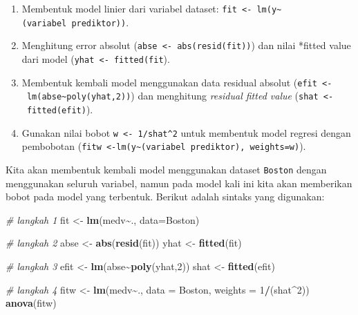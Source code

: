 \documentclass[
]{book}
\newenvironment{Shaded}{\begin{snugshade}}{\end{snugshade}}
\newcommand{\AttributeTok}[1]{\textcolor[rgb]{0.13,0.29,0.53}{#1}}
\newcommand{\CommentTok}[1]{\textcolor[rgb]{0.56,0.35,0.01}{\textit{#1}}}
\newcommand{\DecValTok}[1]{\textcolor[rgb]{0.00,0.00,0.81}{#1}}
\newcommand{\FunctionTok}[1]{\textcolor[rgb]{0.13,0.29,0.53}{\textbf{#1}}}
\newcommand{\NormalTok}[1]{#1}
\newcommand{\OtherTok}[1]{\textcolor[rgb]{0.56,0.35,0.01}{#1}}
\newcommand{\SpecialCharTok}[1]{\textcolor[rgb]{0.81,0.36,0.00}{\textbf{#1}}}
\providecommand{\tightlist}{%
  \setlength{\itemsep}{0pt}\setlength{\parskip}{0pt}}
\theoremstyle{definition}
\theoremstyle{definition}
\theoremstyle{definition}
\theoremstyle{definition}
\theoremstyle{remark}
\begin{document}
\begin{enumerate}
\def\labelenumi{\arabic{enumi}.}
\tightlist
\item
  Membentuk model linier dari variabel dataset: \texttt{fit\ \textless{}-\ lm(y\textasciitilde{}(variabel\ prediktor))}.
\item
  Menghitung error absolut (\texttt{abse\ \textless{}-\ abs(resid(fit))}) dan nilai *fitted value dari model (\texttt{yhat\ \textless{}-\ fitted(fit}).
\item
  Membentuk kembali model menggunakan data residual absolut (\texttt{efit\ \textless{}-\ lm(abse\textasciitilde{}poly(yhat,2))}) dan menghitung \emph{residual fitted value} (\texttt{shat\ \textless{}-\ fitted(efit)}).
\item
  Gunakan nilai bobot \texttt{w\ \textless{}-\ 1/shat\^{}2} untuk membentuk model regresi dengan pembobotan (\texttt{fitw\ \textless{}-lm(y\textasciitilde{}(variabel\ prediktor),\ weights=w)}).
\end{enumerate}

Kita akan membentuk kembali model menggunakan dataset \texttt{Boston} dengan menggunakan seluruh variabel, namun pada model kali ini kita akan memberikan bobot pada model yang terbentuk. Berikut adalah sintaks yang digunakan:

\begin{Shaded}
\begin{Highlighting}[]
\CommentTok{\# langkah 1}
\NormalTok{fit }\OtherTok{\textless{}{-}} \FunctionTok{lm}\NormalTok{(medv}\SpecialCharTok{\textasciitilde{}}\NormalTok{., }\AttributeTok{data=}\NormalTok{Boston)}

\CommentTok{\# langkah 2}
\NormalTok{abse }\OtherTok{\textless{}{-}} \FunctionTok{abs}\NormalTok{(}\FunctionTok{resid}\NormalTok{(fit))}
\NormalTok{yhat }\OtherTok{\textless{}{-}} \FunctionTok{fitted}\NormalTok{(fit)}

\CommentTok{\# langkah 3}
\NormalTok{efit }\OtherTok{\textless{}{-}} \FunctionTok{lm}\NormalTok{(abse}\SpecialCharTok{\textasciitilde{}}\FunctionTok{poly}\NormalTok{(yhat,}\DecValTok{2}\NormalTok{))}
\NormalTok{shat }\OtherTok{\textless{}{-}} \FunctionTok{fitted}\NormalTok{(efit)}

\CommentTok{\# langkah 4}
\NormalTok{fitw }\OtherTok{\textless{}{-}} \FunctionTok{lm}\NormalTok{(medv}\SpecialCharTok{\textasciitilde{}}\NormalTok{., }\AttributeTok{data =}\NormalTok{ Boston, }\AttributeTok{weights =} \DecValTok{1}\SpecialCharTok{/}\NormalTok{(shat}\SpecialCharTok{\^{}}\DecValTok{2}\NormalTok{))}
\FunctionTok{anova}\NormalTok{(fitw)}
\end{Highlighting}
\end{Shaded}
\end{document}
